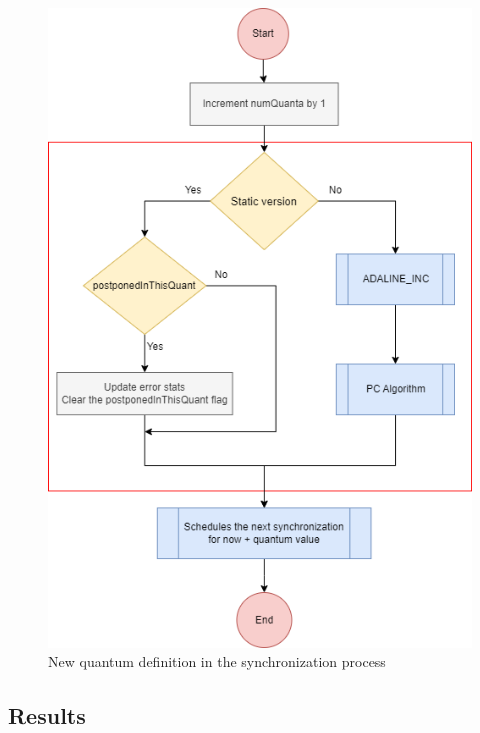 \begin{figure}[H]
	\centering
 	\includegraphics[width=0.5\linewidth]{Images/NewGlobalSyncEventStatic.png}
 	\caption{New quantum definition in the synchronization process}
	\label{fig_NewGlobalSyncEventStatic}
\end{figure}

\subsection{Results}























